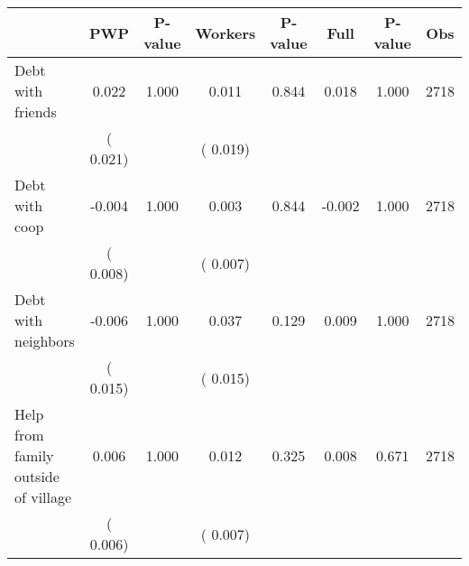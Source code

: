 
\begin{tabular}{l*{7}{c}}\hline&\multicolumn{1}{c}{PWP}&\multicolumn{1}{c}{P-value}&\multicolumn{1}{c}{Workers}&\multicolumn{1}{c}{P-value}&\multicolumn{1}{c}{Full}&\multicolumn{1}{c}{P-value}&\multicolumn{1}{c}{Obs} \\ \hline

 Debt with friends       &              0.022       &        1.000  &              0.011       &        0.844  &              0.018       &              1.000 &  2718 \\ 
                       &       (       0.021)             &                               &       (       0.019)                     &                               &                                               &                                &                      \\ 

 Debt with coop       &             -0.004       &        1.000  &              0.003       &        0.844  &             -0.002       &              1.000 &  2718 \\ 
                       &       (       0.008)             &                               &       (       0.007)                     &                               &                                               &                                &                      \\ 

 Debt with neighbors       &             -0.006       &        1.000  &              0.037       &        0.129  &              0.009       &              1.000 &  2718 \\ 
                       &       (       0.015)             &                               &       (       0.015)                     &                               &                                               &                                &                      \\ 

 Help from family outside of village       &              0.006       &        1.000  &              0.012       &        0.325  &              0.008       &              0.671 &  2718 \\ 
                       &       (       0.006)             &                               &       (       0.007)                     &                               &                                               &                                &                      \\ 


\end{tabular}
